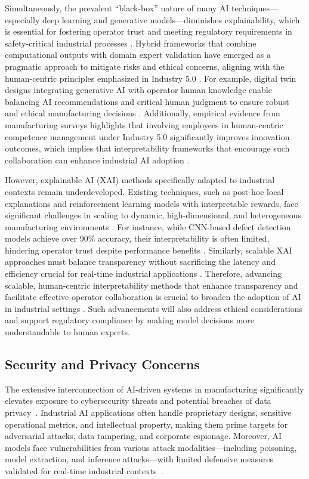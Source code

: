 \documentclass[sigconf]{acmart}
\begin{document}
Simultaneously, the prevalent ``black-box'' nature of many AI techniques—especially deep learning and generative models—diminishes explainability, which is essential for fostering operator trust and meeting regulatory requirements in safety-critical industrial processes \cite{ref2,ref34}. Hybrid frameworks that combine computational outputs with domain expert validation have emerged as a pragmatic approach to mitigate risks and ethical concerns, aligning with the human-centric principles emphasized in Industry 5.0 \cite{ref2,ref14}. For example, digital twin designs integrating generative AI with operator human knowledge enable balancing AI recommendations and critical human judgment to ensure robust and ethical manufacturing decisions \cite{ref2}. Additionally, empirical evidence from manufacturing surveys highlights that involving employees in human-centric competence management under Industry 5.0 significantly improves innovation outcomes, which implies that interpretability frameworks that encourage such collaboration can enhance industrial AI adoption \cite{ref14}.

However, explainable AI (XAI) methods specifically adapted to industrial contexts remain underdeveloped. Existing techniques, such as post-hoc local explanations and reinforcement learning models with interpretable rewards, face significant challenges in scaling to dynamic, high-dimensional, and heterogeneous manufacturing environments \cite{ref14,ref36}. For instance, while CNN-based defect detection models achieve over 90\% accuracy, their interpretability is often limited, hindering operator trust despite performance benefits \cite{ref34}. Similarly, scalable XAI approaches must balance transparency without sacrificing the latency and efficiency crucial for real-time industrial applications \cite{ref36}. Therefore, advancing scalable, human-centric interpretability methods that enhance transparency and facilitate effective operator collaboration is crucial to broaden the adoption of AI in industrial settings \cite{ref14}. Such advancements will also address ethical considerations and support regulatory compliance by making model decisions more understandable to human experts.

\subsection{Security and Privacy Concerns}

The extensive interconnection of AI-driven systems in manufacturing significantly elevates exposure to cybersecurity threats and potential breaches of data privacy~\cite{ref13,ref37}. Industrial AI applications often handle proprietary designs, sensitive operational metrics, and intellectual property, making them prime targets for adversarial attacks, data tampering, and corporate espionage. Moreover, AI models face vulnerabilities from various attack modalities—including poisoning, model extraction, and inference attacks—with limited defensive measures validated for real-time industrial contexts~\cite{ref37,ref41}.
\end{document}
